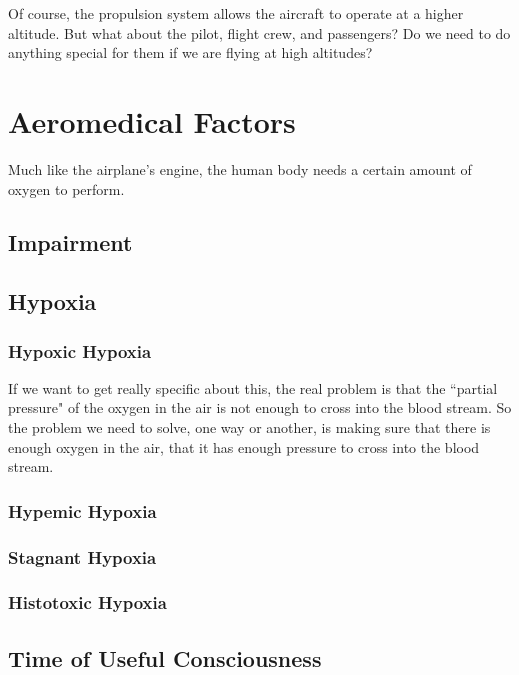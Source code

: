 Of course, the propulsion system allows the aircraft to operate at a higher altitude. But what about the pilot, flight crew, and passengers? Do we need to do anything special for them if we are flying at high altitudes?

\section{Aeromedical Factors}

Much like the airplane's engine, the human body needs a certain amount of oxygen to perform.

\subsection{Impairment}

\subsection{Hypoxia}

\subsubsection{Hypoxic Hypoxia}

If we want to get really specific about this, the real problem is that the ``partial pressure" of the oxygen in the air is not enough to cross into the blood stream. So the problem we need to solve, one way or another, is making sure that there is enough oxygen in the air, that it has enough pressure to cross into the blood stream.

\subsubsection{Hypemic Hypoxia}

\subsubsection{Stagnant Hypoxia}

\subsubsection{Histotoxic Hypoxia}

\subsection{Time of Useful Consciousness}

